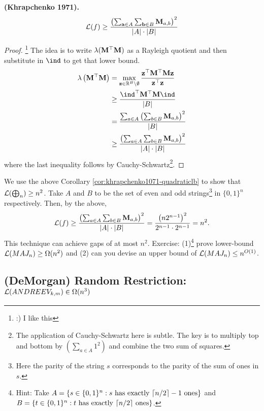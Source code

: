 \documentclass[11pt]{article}
\begin{document}
	\begin{corollary}
		\label{cor:khrapchenko1071-quadraticlb}
		\textbf{(Khrapchenko 1971).}
		\[\mathcal{L}(f) \geq \frac{\left(\sum_{\mathbf{a} \in A}\sum_{\mathbf{b} \in B} \mathbf{M}_{a,b}\right)^2}{|A|\cdot|B|}\]
	\end{corollary}
	\begin{proof}
		\footnote{:) I like this} The idea is to write $\lambda(\mathbf{M}^{\top}\mathbf{M})$ as a Rayleigh quotient and then substitute in $\ind$ to get that lower bound.
		\begin{align*}
			\lambda\left(\mm{M}^{\top}\mm{M}\right) &= \max_{\vv{z} \in \RR^{B}\backslash \emptyset} \frac{\vv{z}^{\top}\mm{M}^{\top}\mm{M}\vv{z}}{\vv{z}^{\top}\vv{z}}\\
			&\geq \frac{\ind^{\top}\mm{M}^{\top}\mm{M}\ind}{|B|}\\
			&=\frac{\sum_{a \in A}\left(\sum_{b \in B}\mm{M}_{a,b}\right)^2}{|B|}\\
			&\geq \frac{\left(\sum_{a \in A} \sum_{b \in B} \mm{M}_{a,b}\right)^2}{|A|\cdot|B|}
		\end{align*}
		where the last inequality follows by Cauchy-Schwartz\footnote{The application of Cauchy-Schwartz here is subtle. The key is to multiply top and bottom by $\left(\sum_{a \in A} 1^2\right)$ and combine the two sum of squares.}.
	\end{proof}
	
	We use the above Corollary \ref{cor:khrapchenko1071-quadraticlb} to show that $\mathcal{L}(\operatorname{\bigoplus}_n) \geq n^2$. Take $A$ and $B$ to be the set of even and odd strings\footnote{Here the parity of the string $s$ corresponds to the parity of the sum of ones in $s$.} in $\{0,1\}^n$ respectively. Then, by the above,
	\[\mathcal{L}(f) \geq \frac{\left(\sum_{a \in A}\sum_{b \in B} \mathbf{M}_{a,b}\right)^2}{|A|\cdot|B|} = \frac{\left(n2^{n-1}\right)^2}{2^{n-1}\cdot 2^{n-1}} = n^2.\]
	This technique can achieve gaps of at most $n^2$. Exercise: (1)\footnote{Hint: Take $A = \{s \in \{0,1\}^n:s\mbox{ has exactly $\lceil n/2\rceil-1$ ones}\}$ and $B = \{t \in \{0,1\}^n:t\mbox{ has exactly $\lceil n/2\rceil$ ones}\}$.} prove lower-bound $\mathcal{L}(MAJ_n) \geq \Omega(n^2)$ and (2) can you devise an upper bound of $\mathcal{L}(MAJ_n) \leq n^{O(1)}$.

	\subsection{(DeMorgan) Random Restriction: \texorpdfstring{$\mathcal{L}(ANDREEV_{k,m}) \in \Omega(n^3)$}{L(ANDREEVkm) in Omega(n3)}}
\end{document}
